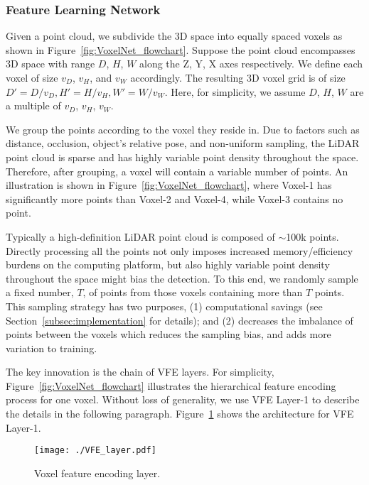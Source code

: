\documentclass[10pt,twocolumn,letterpaper]{article}
\begin{document}
\subsubsection{Feature Learning Network}
\label{subsec:Feature_Learning}
 Given a point cloud, we subdivide the 3D space into equally spaced voxels as shown in Figure~\ref{fig:VoxelNet_flowchart}. Suppose the point cloud encompasses 3D space with range $D$, $H$, $W$ along the Z, Y, X axes respectively. We define each voxel of size $v_D$, $v_H$, and $v_W$ accordingly. The resulting 3D voxel grid is of size $D' = D/v_D, H' = H/v_H, W' = W/v_W$. Here, for simplicity, we assume $D$, $H$, $W$ are a multiple of  $v_D$, $v_H$, $v_W$. 

 We group the points according to the voxel they reside in. Due to factors such as distance, occlusion, object's relative pose, and non-uniform sampling, the LiDAR point cloud is sparse and has highly variable point density throughout the space. Therefore, after grouping, a voxel will contain a variable number of points. An illustration is shown in Figure~\ref{fig:VoxelNet_flowchart}, where Voxel-1 has significantly more points than Voxel-2 and Voxel-4, while Voxel-3  contains no point. 


 Typically a high-definition LiDAR point cloud is composed of $\sim$100k points. Directly processing all the points not only imposes increased memory/efficiency burdens on the computing platform, but also highly variable point density throughout the space might bias the detection. To this end, we  randomly sample a fixed number, $T$, of points from those voxels containing more than $T$ points. This sampling strategy has two purposes, (1) computational savings (see Section~\ref{subsec:implementation} for details); and (2) decreases the imbalance of points between the voxels which reduces the sampling bias, and adds more variation to training.




 The key innovation is the chain of VFE  layers. For simplicity, Figure~\ref{fig:VoxelNet_flowchart} illustrates the hierarchical feature encoding process for one voxel. Without loss of generality, we use VFE Layer-1 to describe the details in the following paragraph. Figure~\ref{fig:VFE} shows the architecture for VFE Layer-1. 

\begin{figure}[!t]
\centering
    \texttt{[image: ./VFE\_layer.pdf]}
      \vspace{-0.3cm}
\caption{Voxel feature encoding layer.}
\label{fig:VFE}
\end{figure}
\end{document}
